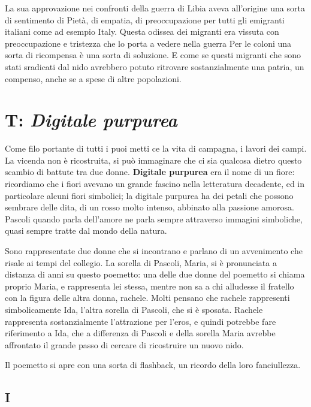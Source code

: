La sua approvazione nei confronti della guerra di Libia aveva all'origine una sorta di sentimento di Pietà, di empatia, di preoccupazione per tutti gli emigranti italiani come ad esempio Italy. Questa odissea dei migranti era vissuta con preoccupazione e tristezza che lo porta a vedere nella guerra Per le coloni una sorta di ricompensa è una sorta di soluzione. E come se questi migranti che sono stati sradicati dal nido avrebbero potuto ritrovare sostanzialmente una patria, un compenso, anche se a spese di altre popolazioni.

\section{T: \textit{Digitale purpurea}}


Come filo portante di tutti i puoi metti ce la vita di campagna, i lavori dei campi. La vicenda non è ricostruita, si può immaginare che ci sia qualcosa dietro questo scambio di battute tra due donne. 
\textbf{Digitale purpurea} era il nome di un fiore: ricordiamo che i fiori avevano un grande fascino nella letteratura decadente, ed in particolare alcuni fiori simbolici; la digitale purpurea ha dei petali che possono sembrare delle dita, di un rosso molto intenso, abbinato alla passione amorosa. Pascoli quando parla dell'amore ne parla sempre attraverso immagini simboliche, quasi sempre tratte dal mondo della natura.

Sono rappresentate due donne che si incontrano e parlano di un avvenimento che risale ai tempi del collegio. La sorella di Pascoli, Maria, si è pronunciata a distanza di anni su questo poemetto: una delle due donne del poemetto si chiama proprio Maria, e rappresenta lei stessa, mentre non sa a chi alludesse il fratello con la figura delle altra donna, rachele.
Molti pensano che rachele rappresenti simbolicamente Ida, l'altra sorella di Pascoli, che si è sposata.
Rachele rappresenta sostanzialmente l'attrazione per l'eros, e quindi potrebbe fare riferimento a Ida, che a differenza di Pascoli e della sorella Maria avrebbe affrontato il grande passo di cercare di ricostruire un nuovo nido.

Il poemetto si apre con una sorta di flashback, un ricordo della loro fanciullezza.

\subsection{I}

